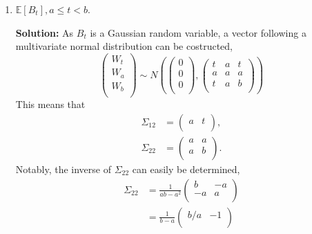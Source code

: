 \documentclass{article}[12pt]
\begin{document}
\begin{enumerate}
	\item $\mathbb E \left[ B_t \right], a \le t < b$.

		\textbf{Solution:} As $B_t$ is a Gaussian random variable, a vector following a multivariate normal distribution can be costructed,
		\begin{equation}
			\begin{pmatrix}
				W_t \\
				W_a \\
				W_b \\
			\end{pmatrix} \sim
			N \left( 
			\begin{pmatrix}
				0 \\
				0 \\
				0 \\
			\end{pmatrix},
			\begin{pmatrix}
				t & a & t \\
				a & a & a \\
				t & a & b \\
			\end{pmatrix}
			\right)
		\end{equation}
This means that
\begin{equation}
	\begin{aligned}
		\Sigma_{12} &= \begin{pmatrix}
		a & t \\	
	\end{pmatrix}, \\
			\Sigma_{22} &= \begin{pmatrix}
				a & a \\
				a & b \\
			\end{pmatrix}.
	\end{aligned}
\end{equation}
Notably, the inverse of $\Sigma_{22}$ can easily be determined,
\begin{equation}
	\begin{aligned}
		\Sigma_{22} &= \frac{1}{ab - a^2} \begin{pmatrix}
			b & -a \\
			-a & a \\
		\end{pmatrix} \\
			    &= \frac{1}{b - a}  \begin{pmatrix}
				    b/a & -1 \\

\end{pmatrix}
\end{aligned}
\end{equation}
\end{enumerate}
\end{document}
